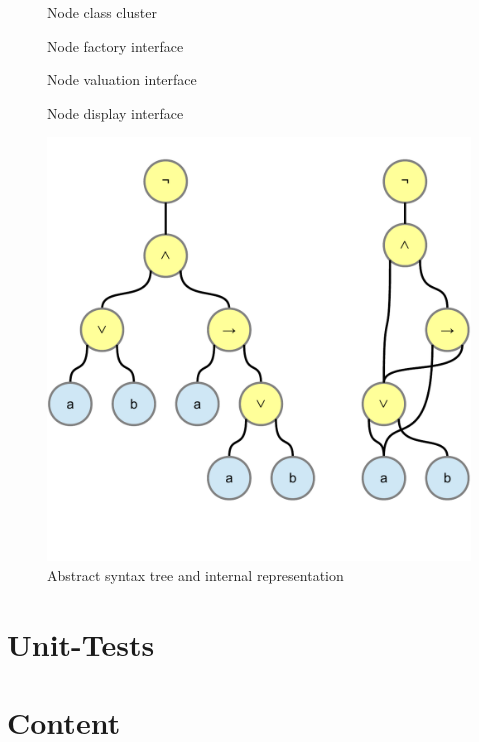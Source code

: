 

%
\begin{figure}[htbp]
\begin{center}
\caption{Node class cluster}
\label{fig:NyayaNodeCluster}
\end{center}
\end{figure}

\begin{figure}[htbp]
\begin{center}
\caption{Node factory interface}
\label{fig:NyayaNodeCreation}
\end{center}
\end{figure}

\begin{figure}[htbp]
\begin{center}
\caption{Node valuation interface}
\label{fig:NyayaNodeValuation}
\end{center}
\end{figure}

\begin{figure}[htbp]
\begin{center}
\caption{Node display interface}
\label{fig:NyayaNodeDisplay}
\end{center}
\end{figure}

\begin{figure}[htbp]
\begin{center}
\includegraphics[scale=0.5]{diagrams/AcyclicSyntaxGraph.pdf}
\caption{Abstract syntax tree and internal representation}
\label{fig:NyayaNodeDisplay}
\end{center}
\end{figure}


\section{Unit-Tests}

\section{Content}



